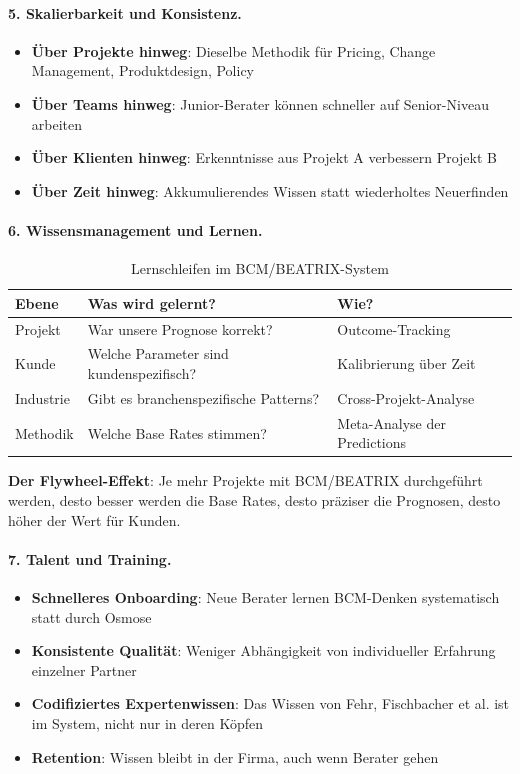 \paragraph{5. Skalierbarkeit und Konsistenz.}

\begin{itemize}
    \item \textbf{Über Projekte hinweg}: Dieselbe Methodik für Pricing, Change Management, Produktdesign, Policy
    \item \textbf{Über Teams hinweg}: Junior-Berater können schneller auf Senior-Niveau arbeiten
    \item \textbf{Über Klienten hinweg}: Erkenntnisse aus Projekt A verbessern Projekt B
    \item \textbf{Über Zeit hinweg}: Akkumulierendes Wissen statt wiederholtes Neuerfinden
\end{itemize}

\paragraph{6. Wissensmanagement und Lernen.}

\begin{table}[h]
\centering
\caption{Lernschleifen im BCM/BEATRIX-System}
\begin{tabular}{@{}lll@{}}
\toprule
\textbf{Ebene} & \textbf{Was wird gelernt?} & \textbf{Wie?} \\
\midrule
Projekt & War unsere Prognose korrekt? & Outcome-Tracking \\
Kunde & Welche Parameter sind kundenspezifisch? & Kalibrierung über Zeit \\
Industrie & Gibt es branchenspezifische Patterns? & Cross-Projekt-Analyse \\
Methodik & Welche Base Rates stimmen? & Meta-Analyse der Predictions \\
\bottomrule
\end{tabular}
\end{table}

\textbf{Der Flywheel-Effekt}: Je mehr Projekte mit BCM/BEATRIX durchgeführt werden, desto besser werden die Base Rates, desto präziser die Prognosen, desto höher der Wert für Kunden.

\paragraph{7. Talent und Training.}

\begin{itemize}
    \item \textbf{Schnelleres Onboarding}: Neue Berater lernen BCM-Denken systematisch statt durch Osmose
    \item \textbf{Konsistente Qualität}: Weniger Abhängigkeit von individueller Erfahrung einzelner Partner
    \item \textbf{Codifiziertes Expertenwissen}: Das Wissen von Fehr, Fischbacher et al. ist im System, nicht nur in deren Köpfen
    \item \textbf{Retention}: Wissen bleibt in der Firma, auch wenn Berater gehen
\end{itemize}

